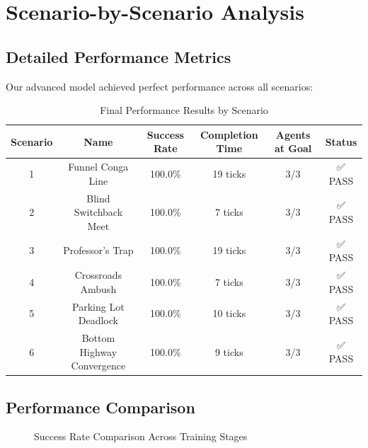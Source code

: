 \documentclass[12pt, a4paper]{report}
\begin{document}
\section{Scenario-by-Scenario Analysis}

\subsection{Detailed Performance Metrics}
Our advanced model achieved perfect performance across all scenarios:

\begin{table}[H]
\centering
\caption{Final Performance Results by Scenario}
\begin{tabular}{|c|c|c|c|c|c|}
\hline
\textbf{Scenario} & \textbf{Name} & \textbf{Success Rate} & \textbf{Completion Time} & \textbf{Agents at Goal} & \textbf{Status} \\
\hline
1 & Funnel Conga Line & 100.0\% & 19 ticks & 3/3 & ✅ PASS \\
2 & Blind Switchback Meet & 100.0\% & 7 ticks & 3/3 & ✅ PASS \\
3 & Professor's Trap & 100.0\% & 19 ticks & 3/3 & ✅ PASS \\
4 & Crossroads Ambush & 100.0\% & 7 ticks & 3/3 & ✅ PASS \\
5 & Parking Lot Deadlock & 100.0\% & 10 ticks & 3/3 & ✅ PASS \\
6 & Bottom Highway Convergence & 100.0\% & 9 ticks & 3/3 & ✅ PASS \\
\hline
\end{tabular}
\end{table}

\subsection{Performance Comparison}
\begin{figure}[H]
\centering
{}
\caption{Success Rate Comparison Across Training Stages}
\end{figure}
\end{document}

